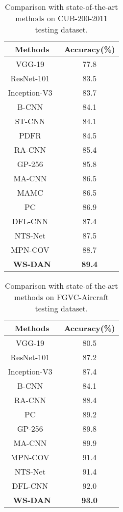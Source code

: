 \documentclass[10pt,twocolumn,letterpaper]{article}
\begin{document}
\begin{table}[h]
	\begin{center}
		\scriptsize
		\begin{tabular}{c|c}
			\hline
			Methods  & Accuracy(\%)\\
			\hline
			VGG-19~\cite{vgg} & 77.8 \\
			ResNet-101~\cite{resnet} & 83.5\\
			Inception-V3~\cite{inception} & 83.7\\
      \hline
			B-CNN~\cite{bcnn} & 84.1\\
			ST-CNN~\cite{stn} & 84.1\\
			PDFR~\cite{PDFR} &  84.5\\
			RA-CNN~\cite{ra-cnn} &  85.4\\
      GP-256~\cite{gp} & 85.8\\
			MA-CNN~\cite{ma-cnn} & 86.5\\
      MAMC~\cite{mamc} & 86.5 \\
      PC~\cite{pairwise_confusion} & 86.9 \\
      DFL-CNN~\cite{dfl-cnn} & 87.4 \\
      NTS-Net~\cite{nes-net} & 87.5\\
      MPN-COV~\cite{mpn-cov} & 88.7\\
      \hline
      \textbf{WS-DAN} & \textbf{89.4} \\
\hline
		\end{tabular}
	\end{center}
	\caption {Comparison with state-of-the-art methods on CUB-200-2011 testing dataset. }
	\label{tab:cub}
\end{table}

\begin{table}[h]
	\begin{center}
		\scriptsize
		\begin{tabular}{c|c}
			\hline
			Methods  & Accuracy(\%)\\
			\hline
VGG-19~\cite{vgg} & 80.5 \\
			ResNet-101~\cite{resnet} & 87.2\\
			Inception-V3~\cite{inception} & 87.4 \\
			\hline
B-CNN~\cite{bcnn} & 84.1\\
			RA-CNN~\cite{ra-cnn}  &  88.4  \\
      PC~\cite{pairwise_confusion} & 89.2 \\
      GP-256~\cite{gp} & 89.8\\
			MA-CNN~\cite{ma-cnn} & 89.9  \\
      MPN-COV~\cite{mpn-cov} & 91.4\\
      NTS-Net~\cite{nes-net} & 91.4\\
      DFL-CNN~\cite{dfl-cnn} & 92.0 \\
			\hline
\textbf{WS-DAN}  & \textbf{93.0}\\
			\hline
		\end{tabular}
	\end{center}
	\caption {Comparison with state-of-the-art methods on FGVC-Aircraft testing dataset. }
	\label{tab:fgvc}
\end{table}
\end{document}
